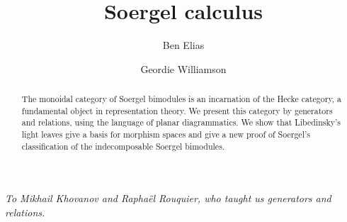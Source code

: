 \documentclass[12pt]{amsart}
\numberwithin{equation}{section}
\theoremstyle{definition}
\theoremstyle{remark}
\begin{document}
\title{Soergel calculus}

\author{Ben Elias} \address{Massachusetts Institute of Technology,
  Boston, USA}
\author{Geordie Williamson} \address{Max-Planck-Institut f\"ur
  Mathematik, Bonn, Germany}

\maketitle

\begin{center}
  \emph{\small{ To Mikhail Khovanov and Rapha\"el Rouquier, who taught us generators and relations.}}
\end{center}

\begin{abstract}
The monoidal category of Soergel bimodules is an
  incarnation of the Hecke category, a fundamental object in
  representation theory. We present
  this category by generators and relations, using the language of
  planar diagrammatics. We show that Libedinsky's light leaves give a
  basis for morphism spaces and give
  a new proof of Soergel's classification of the indecomposable
  Soergel bimodules.
\end{abstract}


 

 


 


  

 





%
%
\end{document}
